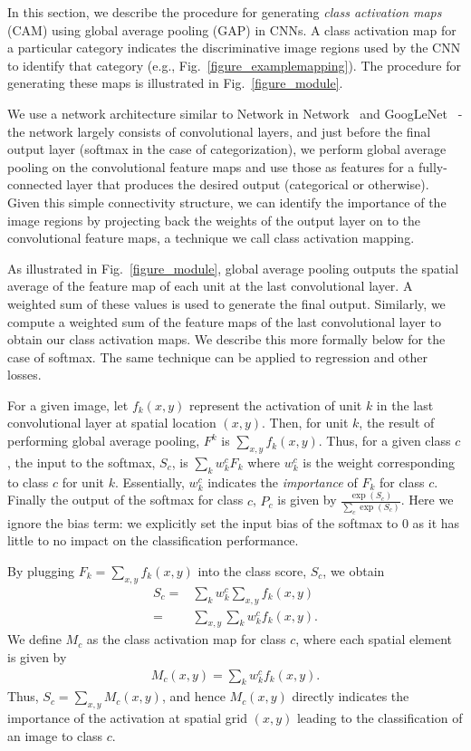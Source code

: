\documentclass[10pt,twocolumn,letterpaper]{article}
\begin{document}
In this section, we describe the procedure for generating \textit{class activation maps} (CAM) using global average pooling (GAP) in CNNs. A class activation map for a particular category indicates the discriminative image regions used by the CNN to identify that category (e.g., Fig.~\ref{figure_examplemapping}). The procedure for generating these maps is illustrated in Fig.~\ref{figure_module}.

We use a network architecture similar to Network in Network~\cite{lin2013network} and GoogLeNet~\cite{szegedy2014going} - the network largely consists of convolutional layers, and just before the final output layer (softmax in the case of categorization), we perform global average pooling on the convolutional feature maps and use those as features for a fully-connected layer that produces the desired output (categorical or otherwise). Given this simple connectivity structure, we can identify the importance of the image regions by projecting back the weights of the output layer on to the convolutional feature maps, a technique we call class activation mapping.


As illustrated in Fig.~\ref{figure_module}, global average pooling outputs the spatial average of the feature map of each unit at the last convolutional layer. A weighted sum of these values is used to generate the final output. Similarly, we  compute a weighted sum of the feature maps of the last convolutional layer to obtain our class activation maps. We describe this more formally below for the case of softmax. The same technique can be applied to regression and other losses.


For a given image, let $f_{k}(x,y)$ represent the activation of unit $k$ in the last convolutional layer at spatial location $(x, y)$. Then, for unit $k$, the result of performing global average pooling, $F^{k}$ is $\sum_{x,y}f_{k}(x,y)$. Thus, for a given class $c$, the input to the softmax, $S_c$, is $\sum_{k}w^{c}_{k}F_{k}$ where $w^{c}_{k}$ is the weight corresponding to class $c$ for unit $k$. Essentially, $w^{c}_{k}$ indicates the \textit{importance} of $F_{k}$ for class $c$. Finally the output of the softmax for class $c$, $P_c$ is given by $\frac{\exp(S_c)}{\sum_{c}\exp(S_c)}$. Here we ignore the bias term: we explicitly set the input bias of the softmax to $0$ as it has little to no impact on the classification performance.


By plugging $F_{k} = \sum_{x,y}f_{k}(x,y)$ into the class score, $S_c$, we obtain
\begin{align}\label{eq:linearscore}
\nonumber S_c = &\sum_{k}w^{c}_{k}\sum_{x,y}f_{k}(x,y)\\
=&\sum_{x,y}\sum_{k}w^{c}_{k}f_{k}(x,y).
\end{align}
We define $M_{c}$ as the class activation map for class $c$, where each spatial element is given by
\begin{align}
M_{c}(x,y) = \sum_{k}w^{c}_{k}f_{k}(x,y).
\end{align} 
Thus, $S_c =\sum_{x,y}M_{c}(x,y)$, and hence $M_{c}(x,y)$ directly indicates the importance of the activation at spatial grid $(x,y)$ leading to the classification of an image to class $c$.
\end{document}
